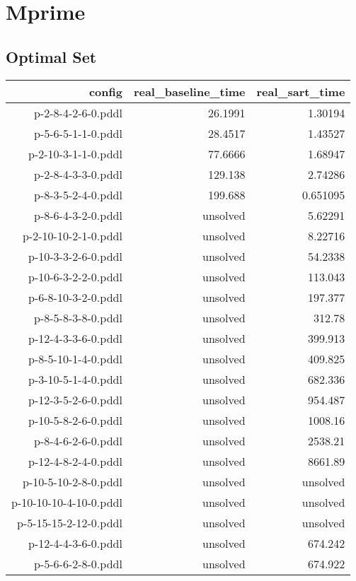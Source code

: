 \documentclass{article}
\begin{document}
                \newpage \section{Mprime}
                    \subsection*{Optimal Set}
                    
                            \begin{center}
                            \scriptsize
                            \begin{tabular}{r|r|r}
                            config & real\_baseline\_time & real\_sart\_time\\\midrule
                             p-2-8-4-2-6-0.pddl&26.1991&1.30194\\
 p-5-6-5-1-1-0.pddl&28.4517&1.43527\\
 p-2-10-3-1-1-0.pddl&77.6666&1.68947\\
 p-2-8-4-3-3-0.pddl&129.138&2.74286\\
 p-8-3-5-2-4-0.pddl&199.688&0.651095\\
 p-8-6-4-3-2-0.pddl&unsolved&5.62291\\
 p-2-10-10-2-1-0.pddl&unsolved&8.22716\\
 p-10-3-3-2-6-0.pddl&unsolved&54.2338\\
 p-10-6-3-2-2-0.pddl&unsolved&113.043\\
 p-6-8-10-3-2-0.pddl&unsolved&197.377\\
 p-8-5-8-3-8-0.pddl&unsolved&312.78\\
 p-12-4-3-3-6-0.pddl&unsolved&399.913\\
 p-8-5-10-1-4-0.pddl&unsolved&409.825\\
 p-3-10-5-1-4-0.pddl&unsolved&682.336\\
 p-12-3-5-2-6-0.pddl&unsolved&954.487\\
 p-10-5-8-2-6-0.pddl&unsolved&1008.16\\
 p-8-4-6-2-6-0.pddl&unsolved&2538.21\\
 p-12-4-8-2-4-0.pddl&unsolved&8661.89\\
 p-10-5-10-2-8-0.pddl&unsolved&unsolved\\
 p-10-10-10-4-10-0.pddl&unsolved&unsolved\\
 p-5-15-15-2-12-0.pddl&unsolved&unsolved\\
 p-12-4-4-3-6-0.pddl&unsolved&674.242\\
 p-5-6-6-2-8-0.pddl&unsolved&674.922\\

\end{tabular}
\end{center}
\end{document}
